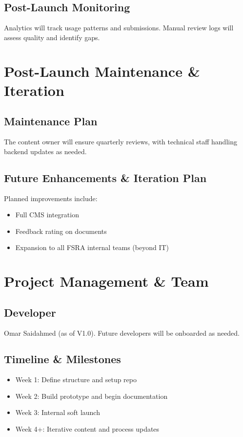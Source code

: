 \documentclass[11pt,a4paper]{article}
\begin{document}
\subsection{Post-Launch Monitoring}
Analytics will track usage patterns and submissions. Manual review logs will assess quality and identify gaps.

\section{Post-Launch Maintenance \& Iteration}

\subsection{Maintenance Plan}
The content owner will ensure quarterly reviews, with technical staff handling backend updates as needed.

\subsection{Future Enhancements \& Iteration Plan}
Planned improvements include:
\begin{itemize}
  \item Full CMS integration
  \item Feedback rating on documents
  \item Expansion to all FSRA internal teams (beyond IT)
\end{itemize}

\section{Project Management \& Team}

\subsection{Developer}
  Omar Saidahmed (as of V1.0). Future developers will be onboarded as needed.

\subsection{Timeline \& Milestones}
\begin{itemize}
  \item Week 1: Define structure and setup repo
  \item Week 2: Build prototype and begin documentation
  \item Week 3: Internal soft launch
  \item Week 4+: Iterative content and process updates
\end{itemize}
\end{document}
